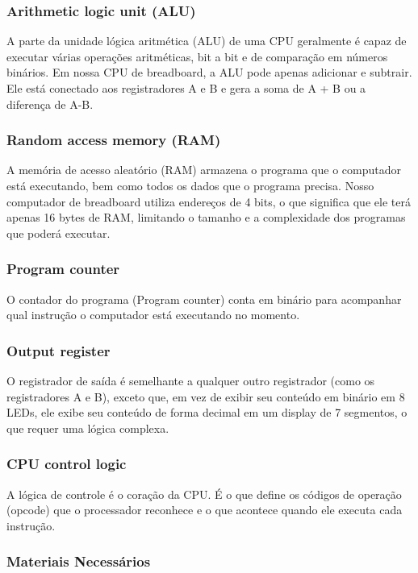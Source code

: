 \subsubsection{Arithmetic logic unit (ALU)}
A parte da unidade lógica aritmética (ALU) de uma CPU geralmente é capaz de executar várias operações aritméticas, bit a bit e de comparação em números binários. Em nossa CPU de breadboard, a ALU pode apenas adicionar e subtrair. Ele está conectado aos registradores A e B e gera a soma de A + B ou a diferença de A-B.

\subsubsection{Random access memory (RAM)}
A memória de acesso aleatório (RAM) armazena o programa que o computador está executando, bem como todos os dados que o programa precisa. Nosso computador de breadboard utiliza endereços de 4 bits, o que significa que ele terá apenas 16 bytes de RAM, limitando o tamanho e a complexidade dos programas que poderá executar.

\subsubsection{Program counter}
O contador do programa (Program counter) conta em binário para acompanhar qual instrução o computador está executando no momento.

\subsubsection{Output register}
O registrador de saída é semelhante a qualquer outro registrador (como os registradores A e B), exceto que, em vez de exibir seu conteúdo em binário em 8 LEDs, ele exibe seu conteúdo de forma decimal em um display de 7 segmentos, o que requer uma lógica complexa.

\subsubsection{CPU control logic}
A lógica de controle é o coração da CPU. É o que define os códigos de operação (opcode) que o processador reconhece e o que acontece quando ele executa cada instrução.

\subsubsection{Materiais Necessários}

\newpage



